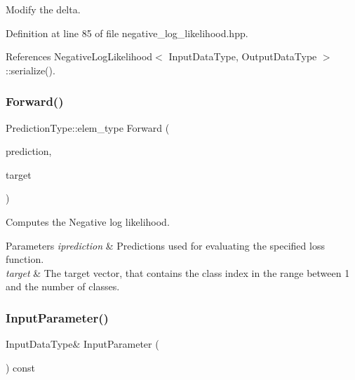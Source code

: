 Modify the delta. 



Definition at line 85 of file negative\+\_\+log\+\_\+likelihood.\+hpp.



References Negative\+Log\+Likelihood$<$ Input\+Data\+Type, Output\+Data\+Type $>$\+::serialize().

\mbox{\label{classmlpack_1_1ann_1_1NegativeLogLikelihood_ab3640059898ea76c13709b8099316fe8}} 
\subsubsection{Forward()}
{\footnotesize\ttfamily Prediction\+Type\+::elem\+\_\+type Forward (\begin{DoxyParamCaption}\item[{const Prediction\+Type \&}]{prediction,  }\item[{const Target\+Type \&}]{target }\end{DoxyParamCaption})}



Computes the Negative log likelihood. 


\begin{DoxyParams}{Parameters}
{\em iprediction} & Predictions used for evaluating the specified loss function. \\
\hline
{\em target} & The target vector, that contains the class index in the range between 1 and the number of classes. \\
\hline
\end{DoxyParams}
\mbox{\label{classmlpack_1_1ann_1_1NegativeLogLikelihood_a1506936601ddae886088d2804623ca4b}} 
\subsubsection{Input\+Parameter()\hspace{0.1cm}{\footnotesize\ttfamily [1/2]}}
{\footnotesize\ttfamily Input\+Data\+Type\& Input\+Parameter (\begin{DoxyParamCaption}{ }\end{DoxyParamCaption}) const\hspace{0.3cm}{\ttfamily [inline]}}




